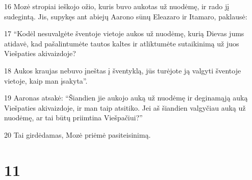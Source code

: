\par 16 Mozė stropiai ieškojo ožio, kuris buvo aukotas už nuodėmę, ir rado jį sudegintą. Jis, supykęs ant abiejų Aarono sūnų Eleazaro ir Itamaro, paklausė: 
\par 17 “Kodėl nesuvalgėte šventoje vietoje aukos už nuodėmę, kurią Dievas jums atidavė, kad pašalintumėte tautos kaltes ir atliktumėte sutaikinimą už juos Viešpaties akivaizdoje? 
\par 18 Aukos kraujas nebuvo įneštas į šventyklą, jūs turėjote ją valgyti šventoje vietoje, kaip man įsakyta”. 
\par 19 Aaronas atsakė: “Šiandien jie aukojo auką už nuodėmę ir deginamąją auką Viešpaties akivaizdoje, ir man taip atsitiko. Jei aš šiandien valgyčiau auką už nuodėmę, ar tai būtų priimtina Viešpačiui?” 
\par 20 Tai girdėdamas, Mozė priėmė pasiteisinimą.



\chapter{11}


